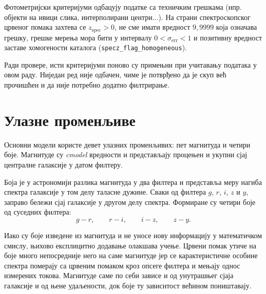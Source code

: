 \documentclass[12pt,oneside]{memoir}
\newcommand{\zspec}{z_{\mathrm{spec}}}
\newcommand{\zerr}{\mathrm{err}}
\begin{document}
Фотометријски критеријуми одбацују податке са техничким грешкама (нпр. објекти на ивици слика, интерполирани центри...).
На страни спектроскопског црвеног помака захтева се $\zspec > 0$, 
не сме имати вредност $9{,}9999$ која означава грешку, грешке мерења мора бити у 
интервалу $0 < \sigma_{\zerr} < 1$ и позитивну вредност заставе хомогености каталога (\texttt{specz\_flag\_homogeneous}).


Ради провере, исти критеријуми поново су примењни при учитавању података
у овом раду. Ниједан ред није одбачен, чиме је потврђено да је скуп већ прочишћен
и да није потребно додатно филтрирање.

\section{Улазне променљиве}
\label{sec:ulaz}

Основни модели користе девет улазних променљивих: пет магнитуда и четири боје.
Магнитуде су \emph{cmodel} вредности и представљају процењен и укупни
сјај централне галаксије у датом филтеру.

Боја је у астрономији разлика магнитуда у два филтера и представља 
меру нагиба спектра галаксије у том делу таласне дужине. Сваки од филтера $g$, $r$, $i$, $z$ и $y$, 
заправо бележи сјај галаксије у другом делу спектра. Формиране су четири боје од
суседних филтера:
%
\begin{equation}
  g-r,\qquad r-i,\qquad i-z,\qquad z-y .
  \label{eq:boje}
\end{equation}

Иако су боје изведене из магнитуда и не уносе нову информацију у математичком смислу,
њихово експлицитно додавање олакшава учење. Црвени помак утиче на боје много непосредније
него на саме магнитуде јер се карактеристичне особине спектра померају са црвеним помаком кроз
опсеге филтера и мењају однос измерених токова. Магнитуде саме по себи зависе и од унутрашњег сјаја галаксије
и од њене удаљености, док боје ту зависнтост већином поништавају.
\end{document}
